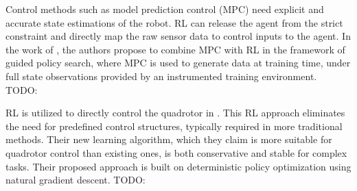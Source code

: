 \documentclass{article}
\begin{document}
Control methods such as model prediction control (MPC) need
explicit and accurate state estimations of the robot.
RL can release the agent from the strict constraint and 
directly map the raw sensor data to control inputs to the agent.
In the work of \textcite{zhang2016learning}, the authors propose to combine MPC with RL in the framework of guided policy search, where MPC is used to generate data at training time, under full state observations provided by an instrumented training environment.
TODO: 


RL is utilized to directly control the quadrotor in \textcite{hwangbo2017control}.
This RL approach eliminates the need for predefined control structures, typically required in more traditional methods. 
Their new learning algorithm, which they claim is more suitable for quadrotor control than existing ones, is both conservative and stable for complex tasks. 
Their proposed approach is built on deterministic policy optimization using natural gradient descent.
TODO: 


\printbibliography
\end{document}
